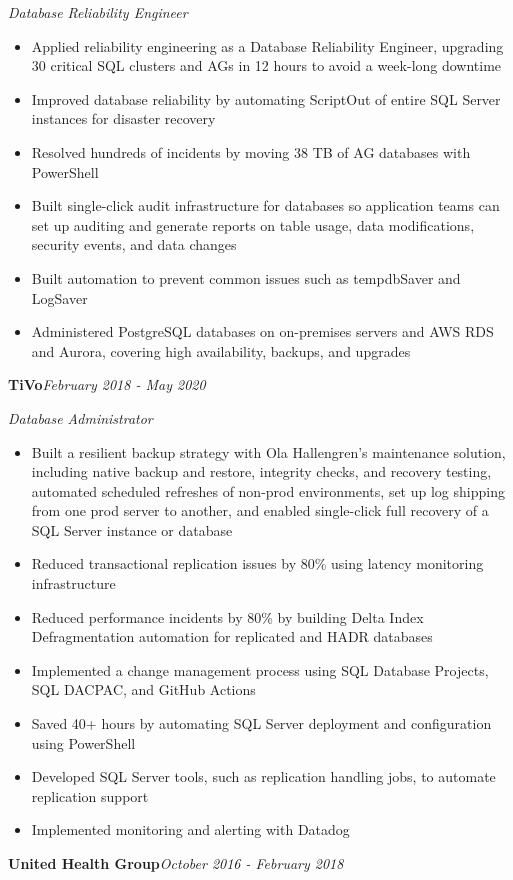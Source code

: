 \documentclass[10pt,a4paper]{article}
\begin{document}
\textit{Database Reliability Engineer}\\[-5pt]
\begin{itemize}
  \item Applied reliability engineering as a Database Reliability Engineer, upgrading 30 critical SQL clusters and AGs in 12 hours to avoid a week-long downtime
  \item Improved database reliability by automating ScriptOut of entire SQL Server instances for disaster recovery
  \item Resolved hundreds of incidents by moving 38 TB of AG databases with PowerShell
  \item Built single-click audit infrastructure for databases so application teams can set up auditing and generate reports on table usage, data modifications, security events, and data changes
  \item Built automation to prevent common issues such as tempdbSaver and LogSaver
  \item Administered PostgreSQL databases on on-premises servers and AWS RDS and Aurora, covering high availability, backups, and upgrades
\end{itemize}
\vspace{14.7pt}
\noindent\textbf{TiVo}\hfill \textit{February 2018 - May 2020}

\textit{Database Administrator}\\[-5pt]
\begin{itemize}
  \item Built a resilient backup strategy with Ola Hallengren's maintenance solution, including native backup and restore, integrity checks, and recovery testing, automated scheduled refreshes of non-prod environments, set up log shipping from one prod server to another, and enabled single-click full recovery of a SQL Server instance or database
  \item Reduced transactional replication issues by 80\% using latency monitoring infrastructure
  \item Reduced performance incidents by 80\% by building Delta Index Defragmentation automation for replicated and HADR databases
  \item Implemented a change management process using SQL Database Projects, SQL DACPAC, and GitHub Actions
  \item Saved 40+ hours by automating SQL Server deployment and configuration using PowerShell
  \item Developed SQL Server tools, such as replication handling jobs, to automate replication support
  \item Implemented monitoring and alerting with Datadog
\end{itemize}
\vspace{14.7pt}
\noindent\textbf{United Health Group}\hfill \textit{October 2016 - February 2018}
\end{document}
